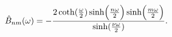 \begin{equation}
\hat B_{nm}(\omega)=-{2\coth ({\omega \over 2})\sinh\Bigl
({n\omega \over 2}\Bigr ) \sinh \Bigl ({m\omega \over 2}\Bigr)
\over \sinh ({\nu \omega \over 2})}. \label{b}
\end{equation}

